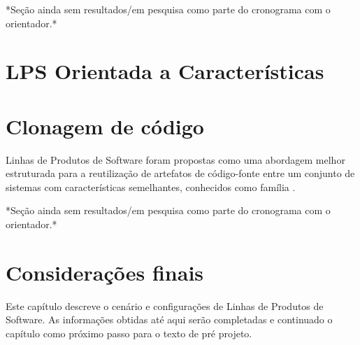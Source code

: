 *Seção ainda sem resultados/em pesquisa como parte do cronograma com o orientador.*


\section{LPS Orientada a Características}


\section{Clonagem de código}

Linhas de Produtos de Software foram propostas como uma abordagem melhor estruturada para a  reutilização de artefatos de código-fonte entre um conjunto de sistemas com características semelhantes, conhecidos como família .	

*Seção ainda sem resultados/em pesquisa como parte do cronograma com o orientador.*

\section{Considerações finais}

Este capítulo descreve o cenário e configurações de Linhas de Produtos de Software. As informações obtidas até aqui serão completadas e continuado o capítulo como próximo passo para o texto de pré projeto.